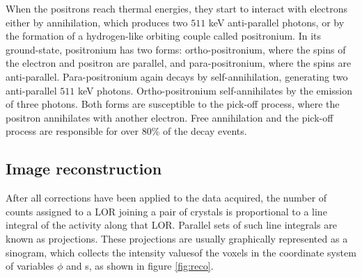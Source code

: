 When the positrons reach thermal energies, they start to interact with electrons either by annihilation, which produces two $511$ keV anti-parallel photons, or by the formation of a hydrogen-like orbiting couple called positronium. In its ground-state, positronium has two forms: ortho-positronium, where the spins of the electron and positron are parallel, and para-positronium, where the spins are anti-parallel. Para-positronium again decays by self-annihilation, generating two anti-parallel $511$ keV photons. Ortho-positronium self-annihilates by the emission of three photons. Both forms are susceptible to the pick-off process, where the positron annihilates with another electron. Free annihilation and the pick-off process are responsible for over $80\%$ of the decay events.

\subsection{Image reconstruction}

After all corrections have been applied to the data acquired, the number of counts assigned to a LOR joining a pair of crystals is proportional to a line integral of the activity along that LOR. Parallel sets of such line integrals are known as projections.
These projections are usually graphically represented as a sinogram, which collects the intensity valuesof the voxels in the coordinate system of variables $\phi$ and s, as shown in figure \ref{fig:reco}.

